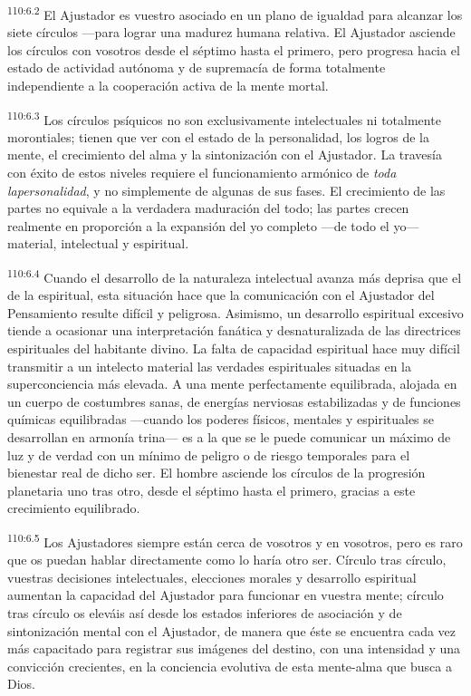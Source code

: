 \documentclass[twoside, 11pt]{book}
\begin{document}
\par
\textsuperscript{110:6.2} El Ajustador es vuestro asociado en un plano de igualdad para alcanzar los siete círculos ---para lograr una madurez humana relativa. El Ajustador asciende los círculos con vosotros desde el séptimo hasta el primero, pero progresa hacia el estado de actividad autónoma y de supremacía de forma totalmente independiente a la cooperación activa de la mente mortal.

\par
\textsuperscript{110:6.3} Los círculos psíquicos no son exclusivamente intelectuales ni totalmente morontiales; tienen que ver con el estado de la personalidad, los logros de la mente, el crecimiento del alma y la sintonización con el Ajustador. La travesía con éxito de estos niveles requiere el funcionamiento armónico de \textit{toda lapersonalidad}, y no simplemente de algunas de sus fases. El crecimiento de las partes no equivale a la verdadera maduración del todo; las partes crecen realmente en proporción a la expansión del yo completo ---de todo el yo--- material, intelectual y espiritual.

\par
\textsuperscript{110:6.4} Cuando el desarrollo de la naturaleza intelectual avanza más deprisa que el de la espiritual, esta situación hace que la comunicación con el Ajustador del Pensamiento resulte difícil y peligrosa. Asimismo, un desarrollo espiritual excesivo tiende a ocasionar una interpretación fanática y desnaturalizada de las directrices espirituales del habitante divino. La falta de capacidad espiritual hace muy difícil transmitir a un intelecto material las verdades espirituales situadas en la superconciencia más elevada. A una mente perfectamente equilibrada, alojada en un cuerpo de costumbres sanas, de energías nerviosas estabilizadas y de funciones químicas equilibradas ---cuando los poderes físicos, mentales y espirituales se desarrollan en armonía trina--- es a la que se le puede comunicar un máximo de luz y de verdad con un mínimo de peligro o de riesgo temporales para el bienestar real de dicho ser. El hombre asciende los círculos de la progresión planetaria uno tras otro, desde el séptimo hasta el primero, gracias a este crecimiento equilibrado.

\par
\textsuperscript{110:6.5} Los Ajustadores siempre están cerca de vosotros y en vosotros, pero es raro que os puedan hablar directamente como lo haría otro ser. Círculo tras círculo, vuestras decisiones intelectuales, elecciones morales y desarrollo espiritual aumentan la capacidad del Ajustador para funcionar en vuestra mente; círculo tras círculo os eleváis así desde los estados inferiores de asociación y de sintonización mental con el Ajustador, de manera que éste se encuentra cada vez más capacitado para registrar sus imágenes del destino, con una intensidad y una convicción crecientes, en la conciencia evolutiva de esta mente-alma que busca a Dios.
\end{document}
